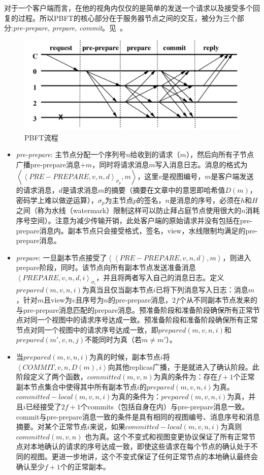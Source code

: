 对于一个客户端而言，在他的视角内仅仅的是简单的发送一个请求以及接受多个回复的过程。所以PBFT的核心部分在于服务器节点之间的交互，被分为三个部分:\emph{pre-prepare, prepare, commit}。见~。
\begin{figure}
	\centering
	\includegraphics[width=1\textwidth]{../common/PBFT_1.png}
	\caption{PBFT流程} 
	\label{fig:PBFT1}
\end{figure}
\begin{itemize}
	\item \emph{pre-prepare}: 主节点分配一个序列号$n$给收到的请求（$m$），然后向所有子节点广播pre-prepare消息$+m$，同时将请求消息$m$写入消息日志。消息的格式为$\left\langle\left\langle PRE-PREPARE,v,n,d\right\rangle _{\sigma_p},m\right\rangle$，这里$v$是视图编号，$m$是客户端发送的请求消息，$d$是请求消息$m$的摘要（摘要在文章中的意思即哈希值$D(m)$，密码学上难以做逆运算），$\sigma_p$为主节点$p$的签名，$n$是消息的序号，必须在$h$和$H$之间（称为水线（watermark）限制这样可以防止拜占庭节点使用很大的$n$消耗序号空间）。注意为减少传输开销，此处客户端的原始请求并没有包括在pre-prepare消息内。副本节点只会接受格式，签名，view，水线限制均满足的pre-prepare消息。
	
    \item \emph{prepare}: 一旦副本节点接受了$\left\langle\left\langle PRE-PREPARE,v,n,d\right\rangle,m\right\rangle$，则进入prepare阶段，同时。该节点向所有副本节点发送准备消息$\left\langle PREPARE,v,n,d,i \right\rangle_{\sigma_i	}$，并且将两者写入自己的消息日志。定义$prepared(m,v,n,i)$为真当且仅当副本节点$i$已将下列消息写入日志：消息$m$，针对$m$且view为$v$且序号为$n$的pre-prepare消息，$2f$个从不同副本节点发来的与pre-prepare消息匹配的prepare消息。预准备阶段和准备阶段确保所有正常节点对同一个视图中的请求序号达成一致。预准备阶段和准备阶段确保所有正常节点对同一个视图中的请求序号达成一致，即$prepared(m,v,n,i)$和$prepared(m',v,n,j)$不能同时为真（若$m\neq m'$）。
    
    \item 当$prepared(m,v,n,i)$为真的时候，副本节点$i$将$\left\langle COMMIT,v,n,D(m),i\right\rangle$向其他replicas广播，于是就进入了确认阶段。此阶段定义了两个函数，$committed(m,v,n)$为真的条件为：存在$f+1$个正常副本节点集合中使得其中所有副本节点$i$的$prepared(m,v,n,i)$为真。$committed-local(m,v,n,i)$为真的条件为：$prepared(m,v,n,i)$为真，并且$i$已经接受了$2f+1$个commits（包括自身在内）与pre-prepare消息一致。commit与pre-prepare消息一致的条件是具有相同的视图编号、消息序号和消息摘要。对某个正常节点$i$来说，如果$committed-local(m,v,n,i)$为真则$committed(m,v,n)$	也为真。这个不变式和视图变更协议保证了所有正常节点对本地确认的请求的序号达成一致，即使这些请求在每个节点的确认处于不同的视图。更进一步地讲，这个不变式保证了任何正常节点的本地确认最终会确认至少$f+1$个的正常副本。
\end{itemize}
